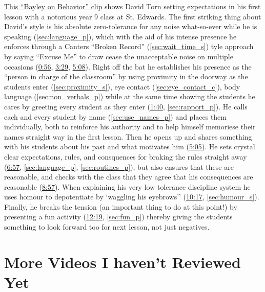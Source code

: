 \documentclass[12pt]{report}
\begin{document}
\begin{appendices}
\href{https://www.youtube.com/watch?v=ec0v4kzYkCY}{This ``Bayley on Behavior'' clip} shows David Torn setting expectations in his first lesson with a notorious year 9 class at St. Edwards. The first striking thing about David's style is his absolute zero-tolerance for any noise what-so-ever while he is speaking (\ref{sec:language_p}), which with the aid of his intense presence he enforces through a Canters ``Broken Record'' (\ref{sec:wait_time_s}) tyle approach by saying ``Excuse Me'' to draw cease the unacceptable noise on multiple occasions (\href{https://www.youtube.com/watch?v=ec0v4kzYkCY&t=56}{0:56}, \href{https://www.youtube.com/watch?v=ec0v4kzYkCY&t=209}{3:29}, \href{https://www.youtube.com/watch?v=ec0v4kzYkCY&t=308}{5:08}). Right off the bat he establishes his presence as the ``person in charge of the classroom'' by using proximity in the doorway as the students enter (\ref{sec:proximity_s}), eye contact (\ref{sec:eye_contact_c}), body language (\ref{sec:non_verbals_p}) while at the same time showing the students he cares by greeting every student as they enter (\href{https://www.youtube.com/watch?v=ec0v4kzYkCY&t=100}{1:40}, \ref{sec:rapport_p}). He calls each and every student by name (\ref{sec:use_names_p}) and places them individually, both to reinforce his authority and to help himself memoriese their names straight way in the first lesson. Then he opens up and shares something with his students about his past and what motivates him (\href{https://www.youtube.com/watch?v=ec0v4kzYkCY&t=305}{5:05}). He sets crystal clear expectations, rules, and consquences for braking the rules straight away (\href{https://www.youtube.com/watch?v=ec0v4kzYkCY&t=417}{6:57}, \ref{sec:language_p}, \ref{sec:routines_p}), but also ensures that these are reasonable, and checks with the class that they agree that his consequences are reasonable (\href{https://www.youtube.com/watch?v=ec0v4kzYkCY&t=537}{8:57}). When explaining his very low tolerance discipline system he uses homour to depotentiate by `waggling his eyebrows'' (\href{https://www.youtube.com/watch?v=ec0v4kzYkCY&t=617}{10:17}, \ref{sec:humour_s}). Finally, he breaks the tension (an important thing to do at this point!) by presenting a fun activity (\href{https://www.youtube.com/watch?v=ec0v4kzYkCY&t=739}{12:19}, \ref{sec:fun_p}) thereby giving the students something to look forward too for next lesson, not just negatives.




\section{More Videos I haven't Reviewed Yet}
\label{video:other}


\end{appendices}
\end{document}

